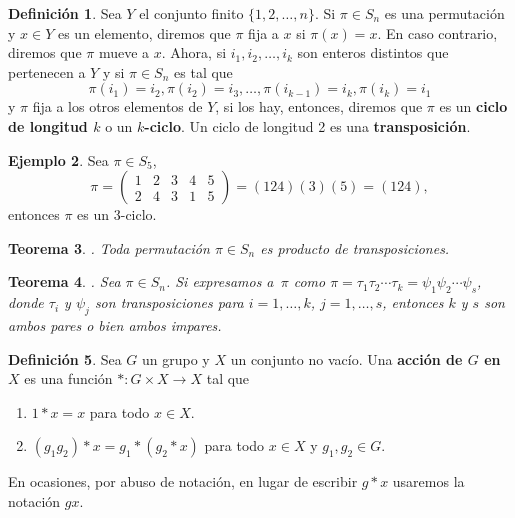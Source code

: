 \documentclass[12pt]{book}
\newtheorem{theorem}{Teorema}[section]
\theoremstyle{definition}
\newtheorem{definition}[theorem]{Definición}
\newtheorem{example}[theorem]{Ejemplo}
\newcounter{in}
\newcounter{ini}
\begin{document}
\begin{definition}
  \label{trans}
  Sea $Y$ el conjunto finito $\{1,2,\ldots,n\}$. Si $\pi\in S_{n}$ es una permutación y
  $x\in Y$ es un elemento, diremos que $\pi$ fija a $x$ si
  $\pi(x)=x$. En caso contrario, diremos que $\pi$ mueve a $x$. Ahora,
  si $i_{1},i_{2},\ldots, i_{k}$ son enteros distintos que pertenecen a
  $Y$ y si $\pi\in S_{n}$ es tal que
  $$\pi(i_{1})=i_{2},\pi(i_{2})=i_{3},\ldots,\pi(i_{k-1})=i_{k},\pi(i_{k})=i_{1}$$
  y $\pi$ fija a los otros elementos de $Y$, si los hay, entonces,
  diremos que $\pi$ es un \textbf{ciclo de longitud $k$} o un \textbf{$k$-ciclo}. Un ciclo de longitud 2 es una \textbf{transposición}.
\end{definition}

\begin{example}
  Sea $\pi\in S_{5}$, 
  \[\pi=\left(
    \begin{array}{ccccc}
      1 & 2 & 3 & 4 & 5\\
      2 & 4 & 3 & 1 & 5  
    \end{array} 
  \right)=(124)(3)(5)=(124),\]
  entonces $\pi$ es un 3-ciclo.
\end{example}

\begin{theorem}{}.
  \label{per-prod-trans}
  Toda permutación $\pi\in S_{n}$ es producto de transposiciones.
\end{theorem}

\begin{theorem}{}.
  \label{trans-par-impar}
  Sea $\pi\in S_{n}$. Si expresamos a~$\pi$ como $\pi=\tau_{1}\tau_{2}\cdots\tau_{k}=\psi_{1}\psi_{2}\cdots\psi_{s}$,
  donde $\tau_{i}$ y $\psi_{j}$ son transposiciones para
  $i=1,\ldots,k$, $j=1,\ldots,s$, entonces $k$ y $s$
  son ambos pares o bien ambos impares.
\end{theorem}

\begin{definition}
  \label{accion-grupo}
  Sea $G$ un grupo y $X$ un conjunto no vacío. Una  \textbf{acción de $G$
  en $X$} es una función $*:G \times X \rightarrow X$ tal que
\begin{enumerate}
\item $1*x=x$ para todo $x\in X.$
\item $(g_{1}g_{2})*x=g_{1}*(g_{2}*x)$ para todo $x\in X$ y $g_{1},g_{2}\in G.$
\end{enumerate}
   En ocasiones, por abuso de notación, en lugar de escribir $g*x$ usaremos la notación $gx$.
\end{definition}
\end{document}
